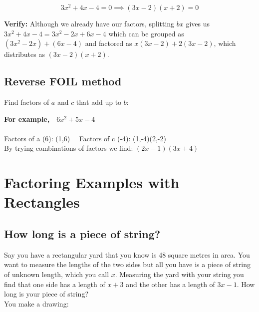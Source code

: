 \documentclass[12pt]{article}
\begin{document}
$$3x^2+4x-4 = 0 \implies (3x-2)(x+2)=0$$

\textbf{Verify:} Although we already have our factors, splitting $bx$ gives us $3x^2+4x-4=3x^2-2x+6x-4$ which can be grouped as $(3x^2-2x)+(6x-4)$ and factored as $x(3x-2)+2(3x-2)$, which distributes as $(3x-2)(x+2)$.

\newpage

\subsection*{Reverse FOIL method}
Find factors of $a$ and $c$ that add up to $b$:
\begin{center}
\end{center}
\textbf{For example,}\ \ $6x^2+5x-4$\\\\
Factors of a (6): (1,6) \ \ Factors of c (-4): (1,-4)(2,-2)\\
By trying combinations of factors we find: $(2x-1)(3x+4)$

\newpage

\section*{Factoring Examples with Rectangles}
\subsection*{How long is a piece of string?}
Say you have a rectangular yard that you know is 48 square metres in area. You want to measure the lengths of the two sides but all you have is a piece of string of unknown length, which you call $x$. Measuring the yard with your string you find that one side has a length of $x+3$ and the other has a length of $3x-1$. How long is your piece of string?\\

You make a drawing:
\begin{center}
\end{center}
\end{document}
